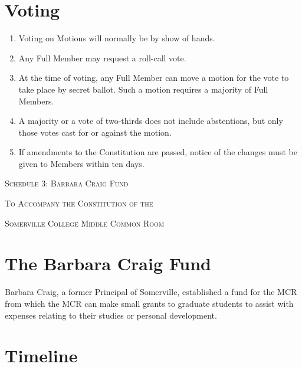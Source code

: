 \documentclass[11pt, a4paper]{article}
\begin{document}
\section{Voting}
\label{sec:meetings_voting}

\begin{enumerate}
	\item Voting on Motions will normally be by show of hands.
    \item Any Full Member may request a roll-call vote.
    \item At the time of voting, any Full Member can move a motion for the vote to take place by secret ballot. Such a motion requires a majority of Full Members.
    \item A majority or a vote of two-thirds does not include abstentions, but only those votes cast for or against the motion.
    \item If amendments to the Constitution are passed, notice of the changes must be given to Members within ten days.
\end{enumerate}





\clearpage
\setcounter{section}{0}





\centerline{{\Huge \textsc{Schedule 3: Barbara Craig Fund}}}
\vspace{2mm}
\centerline{{\Large \textsc{To Accompany the Constitution of the}}}
\vspace{2mm}
\centerline{{\Large \textsc{Somerville College Middle Common Room}}}





\section{The Barbara Craig Fund}
\label{sec:bcf}
Barbara Craig, a former Principal of Somerville, established a fund for the MCR from which the MCR can make small grants to graduate students to assist with expenses relating to their studies or personal development.





\section{Timeline}
\label{sec:timeline}
\end{document}
